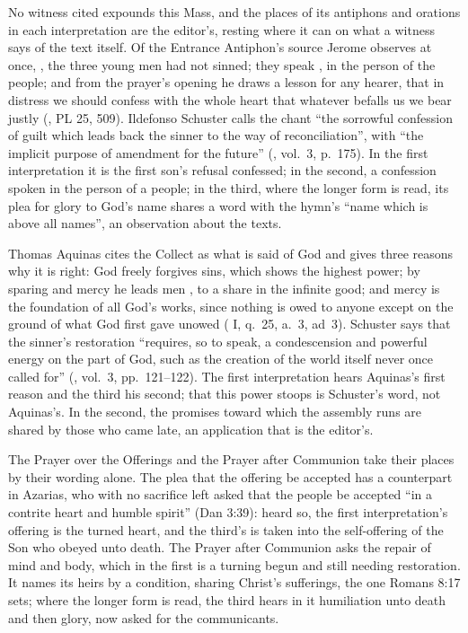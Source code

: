 No witness cited expounds this Mass, and the places of its antiphons and
orations in each interpretation are the editor's, resting where it can on what a
witness says of the text itself. Of the Entrance Antiphon's source Jerome
observes at once, , the three young
men had not sinned; they speak , in the person of the
people; and from the prayer's opening he draws a lesson for any hearer, that in
distress we should confess with the whole heart that whatever befalls us we bear
justly (, PL 25, 509). Ildefonso Schuster calls the chant
``the sorrowful confession of guilt which leads back the sinner to the way of
reconciliation'', with ``the implicit purpose of amendment for the future''
(, vol.~3, p.~175). In the first interpretation it is
the first son's refusal confessed; in the second, a confession spoken in the
person of a people; in the third, where the longer form is read, its plea for
glory to God's name shares a word with the hymn's ``name which is above all names'', an
observation about the texts.

Thomas Aquinas cites the Collect as what is said of God and gives three reasons
why it is right: God freely forgives sins, which shows the highest power; by
sparing and mercy he leads men , to a
share in the infinite good; and mercy is the foundation of all God's works,
since nothing is owed to anyone except on the ground of what God first gave
unowed ( I, q.~25, a.~3, ad~3). Schuster says that the
sinner's restoration ``requires, so to speak, a condescension and powerful
energy on the part of God, such as the creation of the world itself never once
called for'' (, vol.~3, pp.~121--122). The first interpretation hears
Aquinas's first reason and the third his second; that this power stoops is
Schuster's word, not Aquinas's. In the second, the promises toward which the
assembly runs are shared by those who came late, an application that is the
editor's.

The Prayer over the Offerings and the Prayer after Communion take their places
by their wording alone. The plea that the offering be accepted has a counterpart
in Azarias, who with no sacrifice left asked that the people be accepted ``in a contrite heart
and humble spirit'' (Dan 3:39): heard so, the first interpretation's offering
is the turned heart, and the third's is taken into the self-offering of the Son
who obeyed unto death. The Prayer after Communion asks the repair of mind and
body, which in the first is a turning begun and still needing restoration. It
names its heirs by a condition, sharing Christ's sufferings, the one Romans 8:17
sets; where the longer form is read, the third hears in it humiliation unto
death and then glory, now asked for the communicants.

